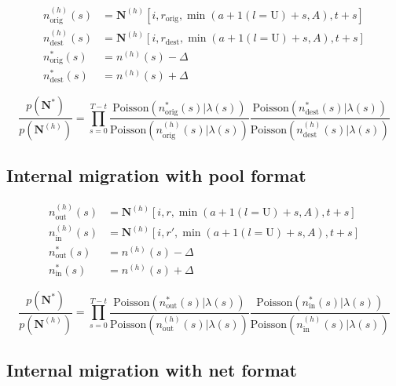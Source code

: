 \documentclass{article}
\begin{document}
\begin{align}
  n_{\text{orig}}^{(h)}(s) & = \bm{N}^{(h)}[i, r_{\text{orig}}, \min(a + 1(l = \text{U}) + s, A), t + s] \\
  n_{\text{dest}}^{(h)}(s) & = \bm{N}^{(h)}[i, r_{\text{dest}}, \min(a + 1(l = \text{U}) + s, A), t + s] \\
  n_{\text{orig}}^*(s) & = n^{(h)}(s) - \Delta \\
  n_{\text{dest}}^*(s) & = n^{(h)}(s) + \Delta
\end{align}

\begin{equation}
  \frac{p(\bm{N}^*)}{p(\bm{N}^{(h)})} = \prod_{s = 0}^{T-t} \frac{ \text{Poisson}\left( n_{\text{orig}}^*(s) | \lambda(s) \right) }{ \text{Poisson}\left( n_{\text{orig}}^{(h)}(s) | \lambda(s) \right) } \frac{ \text{Poisson} \left( n_{\text{dest}}^*(s) | \lambda(s) \right) }{ \text{Poisson}\left( n_{\text{dest}}^{(h)}(s) | \lambda(s) \right) }
\end{equation}

\subsection{Internal migration with pool format}

\begin{align}
  n_{\text{out}}^{(h)}(s) & = \bm{N}^{(h)}[i, r, \min(a + 1(l = \text{U}) + s, A), t + s] \\
  n_{\text{in}}^{(h)}(s) & = \bm{N}^{(h)}[i, r', \min(a + 1(l = \text{U}) + s, A), t + s] \\
  n_{\text{out}}^*(s) & = n^{(h)}(s) - \Delta \\
  n_{\text{in}}^*(s) & = n^{(h)}(s) + \Delta
\end{align}

\begin{equation}
  \frac{p(\bm{N}^*)}{p(\bm{N}^{(h)})} = \prod_{s = 0}^{T-t} \frac{ \text{Poisson}\left( n_{\text{out}}^*(s) | \lambda(s) \right) }{ \text{Poisson}\left( n_{\text{out}}^{(h)}(s) | \lambda(s) \right) } \frac{ \text{Poisson} \left( n_{\text{in}}^*(s) | \lambda(s) \right) }{ \text{Poisson}\left( n_{\text{in}}^{(h)}(s) | \lambda(s) \right) }
\end{equation}

\subsection{Internal migration with net format}
\end{document}
